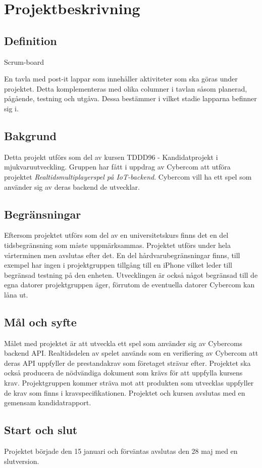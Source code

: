 \section{Projektbeskrivning}

\subsection{Definition}
\begin{labeling}{Scrum-board}
\item [Scrum-board] En tavla med post-it lappar som innehåller aktiviteter som ska göras under 
    projektet. Detta komplementeras med olika columner i tavlan såsom planerad, pågående, 
    testning och utgåva. Dessa bestämmer i vilket stadie lapparna befinner sig i. 
\item
\end{labeling}

\subsection{Bakgrund}
Detta projekt utförs som del av kursen TDDD96 - Kandidatprojekt i mjukvaruutveckling. Gruppen har fått i uppdrag av Cybercom att utföra projektet \textit{Realtidsmultiplayerspel på IoT-backend}. Cybercom vill ha ett spel som använder sig av deras backend de utvecklar.

\subsection{Begränsningar}
Eftersom projektet utförs som del av en universitetskurs finns det en del tidsbegränsning som måste uppmärksammas. Projektet utförs under hela vårterminen men avslutas efter det. En del hårdvarubegränsningar finns, till exempel har ingen i projektgruppen tillgång till en iPhone vilket leder till begränsad testning på den enheten. Utvecklingen är också något begränsad till de egna datorer projektgruppen äger, förrutom de eventuella datorer Cybercom kan låna ut.

\subsection{Mål och syfte}
Målet med projektet är att utveckla ett spel som använder sig av Cybercoms backend API. Realtidsdelen av spelet används som en verifiering av Cybercom att deras API uppfyller de prestandakrav som företaget strävar efter. Projektet ska också producera de nödvändiga dokument som krävs för att uppfylla kursens krav. Projektgruppen kommer sträva mot att produkten som utvecklas uppfyller de krav som finns i kravspecifikationen. Projektet och kursen avslutas med en gemensam kandidatrapport.



\subsection{Start och slut}
Projektet började den 15 januari och förväntas avslutas den 28 maj med en slutversion.

\pagebreak
